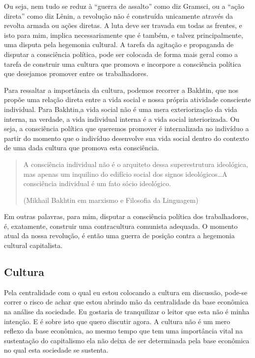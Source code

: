 Ou seja, nem tudo se reduz à “guerra de assalto” como diz Gramsci, ou a “ação direta” como diz Lênin, a revolução não é construída unicamente através da revolta armada ou ações diretas. A luta deve ser travada em todas as frentes, e isto para mim, implica necessariamente que é também, e talvez principalmente, uma disputa pela hegemonia cultural. A tarefa da agitação e propaganda de disputar a consciência política, pode ser colocada de forma mais geral como a tarefa de construir uma cultura que promova e incorpore a consciência política que desejamos promover entre os trabalhadores.

Para ressaltar a importância da cultura, podemos recorrer a Bakhtin, que nos propõe uma relação direta entre a vida social e nossa própria atividade consciente individual. Para Bakhtin,a vida social não é uma mera exteriorização da vida interna, na verdade, a vida individual interna é a vida social interiorizada. Ou seja, a consciência política que queremos promover é internalizada no indivíduo a partir do momento que o indivíduo  desenvolve sua vida social dentro do contexto de uma dada cultura que promova esta consciência. 

\begin{quote}
A consciência individual não é o arquiteto dessa superestrutura ideológica, mas apenas um inquilino do edifício social dos signos ideológicos…A consciência individual é um fato sócio ideológico.

(Mikhail Bakhtin em marxismo e Filosofia da Linguagem)
\end{quote}

Em outras palavras, para mim, disputar a consciência política dos trabalhadores, é, exatamente, construir uma contracultura comunista adequada. O momento atual da nossa revolução, é então uma guerra de posição contra a hegemonia cultural capitalista.

\subsection{Cultura}

Pela centralidade com o qual eu estou colocando a cultura em discussão, pode-se correr o risco de achar que estou abrindo mão da centralidade da base econômica na análise da sociedade. Eu gostaria de tranquilizar o leitor que esta não é minha intenção. E é sobre isto que quero discutir agora. A cultura não é um mero reflexo da base econômica, ao mesmo tempo que tem uma importância vital na sustentação do capitalismo ela não deixa de ser determinada pela base econômica no qual esta sociedade se sustenta.

